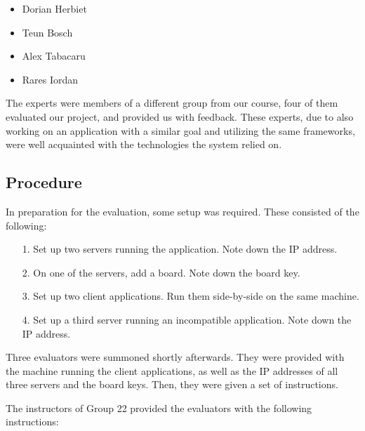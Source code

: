 \begin{itemize}
    \item Dorian Herbiet
    \item Teun Bosch
    \item Alex Tabacaru
    \item Rares Iordan
\end{itemize}

The experts were members of a different group from our course, four of them evaluated our project, and provided us with feedback. These experts, due to also working on an application with a similar goal and utilizing the same frameworks, were well acquainted with the technologies the system relied on.


\subsection{Procedure}


In preparation for the evaluation, some setup was required. These consisted of the following:
\begin{itemize}
    \item [1.] Set up two servers running the application. Note down the IP address.
    \item [2.] On one of the servers, add a board. Note down the board key.
    \item [3.] Set up two client applications. Run them side-by-side on the same machine.
    \item [4.] Set up a third server running an incompatible application. Note down the IP address.
\end{itemize}



Three evaluators were summoned shortly afterwards. They were provided with the machine running the client applications, as well as the IP addresses of all three servers and the board keys. Then, they were given a set of instructions.



The instructors of Group 22 provided the evaluators with the following instructions:

